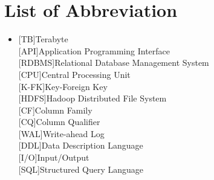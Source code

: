 







\chapter*{List of Abbreviation}
\label{acronyms}
\begin{itemize}

\item[]
\begin{acronym}[Symbols]
	\acro{}[TB]{Terabyte}\\
	\acro{}[API]{Application Programming Interface}\\
	\acro{}[RDBMS]{Relational Database Management System}\\
	\acro{}[CPU]{Central Processing Unit}\\
	\acro{}[K-FK]{Key-Foreign Key}\\
	\acro{}[HDFS]{Hadoop Distributed File System}\\
	\acro{}[CF]{Column Family}\\
	\acro{}[CQ]{Column Qualifier}\\
	\acro{}[WAL]{Write-ahead Log}\\
	\acro{}[DDL]{Data Description Language}\\
	\acro{}[I/O]{Input/Output}\\
	\acro{}[SQL]{Structured Query Language}\\
	
\end{acronym}
\end{itemize}

    
	


